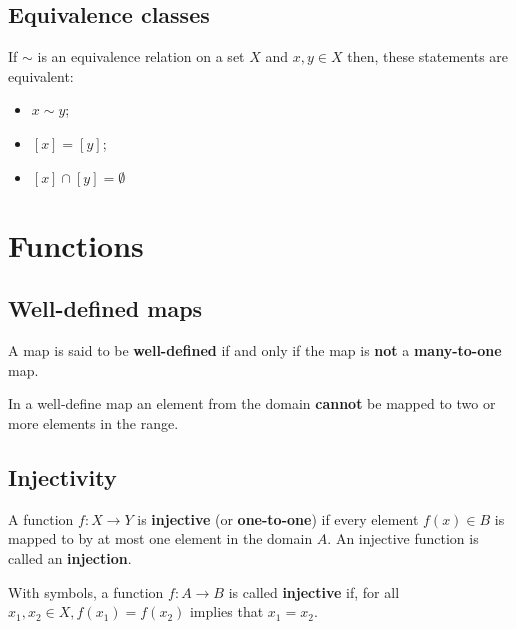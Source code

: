 \documentclass[12pt, a4paper]{article}
\begin{document}
\subsection{Equivalence classes}

\begin{theorem}
    If \(\sim\) is an equivalence relation on a set \(X\) and \(x,y\in X\) then, these statements are equivalent:
    \begin{itemize}
        \item \(x\sim y\);
        \item \([x]=[y]\);
        \item \([x]\cap [y] =\emptyset\)
    \end{itemize}
\end{theorem}

\section{Functions}

\subsection{Well-defined maps}

\begin{definition}
A map is said to be \textbf{well-defined} if and only if the map is \textbf{not} a \textbf{many-to-one} map.
\end{definition}

\begin{mdnote}
    In a well-define map an element from the domain \textbf{cannot} be mapped to two or more elements in the range.
\end{mdnote}

\subsection{Injectivity}

\begin{definition}
    A function $f : X \to Y$ is \textbf{injective} (or \textbf{one-to-one}) if every element $f(x) \in B$ is mapped to by at most one element in the domain $A.$ An injective function is called an \textbf{injection}.
    
    With symbols, a function \(f : A \to B\) is called \textbf{injective} if, for all \(x_1,x_2 \in X, f(x_1)=f(x_2)\)  implies that \(x_1=x_2\).
\end{definition}
    
\end{document}
